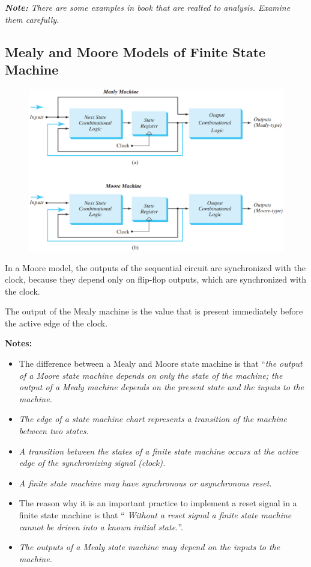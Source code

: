 \textit{\textbf{Note:} There are some examples in book that are realted to analysis. Examine them carefully.}

\subsection{Mealy and Moore Models of Finite State Machine}
\label{subsec:mealy-and-moore-models}

\begin{figure}[H]
  \centering
  \includegraphics[width=\linewidth]{img/fig-5.21.png}
  \caption{}
  \label{fig:5.21}
\end{figure}

In a Moore model, the outputs of the sequential circuit are synchronized with the  clock, because they depend only on flip-flop outputs, which are synchronized with the clock.

The output of the Mealy machine is the value that is present immediately before the active edge of the clock.

\textbf{Notes:}
\begin{itemize}
  \item The difference between a Mealy and Moore state machine is that ``\textit{the output of a Moore state machine depends on only the state of the machine; the output of a Mealy machine depends on the present state and the inputs to the machine.}
  \item \textit{The edge of a state machine chart represents a transition of the machine between two states.}
  \item \textit{A transition between the states of a finite state machine occurs at the active edge of the synchronizing signal (clock).}
  \item \textit{A finite state machine may have synchronous or asynchronous reset.}
  \item The reason why it is an important practice to implement a reset  signal in a finite state machine is that ``\textit{ Without a reset signal a finite state machine cannot be driven into a known initial state.}''.
  \item \textit{The outputs of a Mealy state machine may depend on the inputs to the machine.}
\end{itemize}